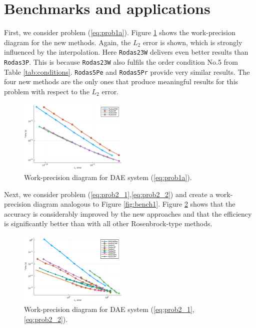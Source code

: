 \documentclass{juliacon}
\begin{document}
\section{Benchmarks and applications} \label{sec:bench}

First, we consider problem (\ref{eq:prob1a}). Figure \ref{fig:bench1a} shows the work-precision diagram for the new methods. Again, the $L_2$ error is shown, which is strongly 
influenced by the interpolation. Here \verb|Rodas23W| delivers even better results than \verb|Rodas3P|. This is because \verb|Rodas23W| also fulfils the order condition No.5 
from Table \ref{tab:conditions}. \verb|Rodas5Pe| and \verb|Rodas5Pr| provide very similar results. The four new methods are the only ones that produce meaningful results for 
this problem with respect to the $L_2$ error.

\begin{figure}
 \centering
 \includegraphics[width=0.47\textwidth]{Abb_1a.pdf}
 \caption{Work-precision diagram for DAE system (\ref{eq:prob1a}).}\label{fig:bench1a}
\end{figure}

Next, we consider problem (\ref{eq:prob2_1},\ref{eq:prob2_2}) and create a work-precision diagram analogous to Figure \ref{fig:bench1}. 
Figure \ref{fig:bench2a} shows that the accuracy is considerably improved by the new approaches and that the efficiency is significantly better 
than with all other Rosenbrock-type methods.

\begin{figure}
 \centering
 \includegraphics[width=0.47\textwidth]{Abb_2a.pdf}
 \caption{Work-precision diagram for DAE system (\ref{eq:prob2_1},\ref{eq:prob2_2}).}\label{fig:bench2a}
\end{figure}
\end{document}
